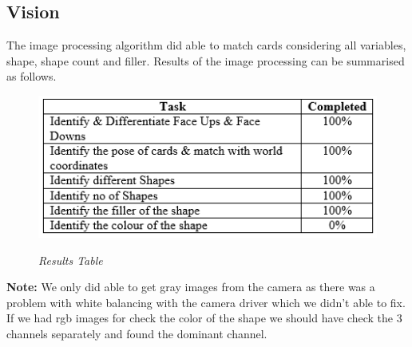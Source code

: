 \subsection{Vision}
The image processing algorithm did able to match cards considering all variables, shape, shape count and filler. Results of the image processing can be summarised as follows.
\begin{figure}[position = here]
	\begin{centering}
		\includegraphics[scale=0.8]{./sachiths_images/image7.png}\\
		\caption[]{\textit{Results Table}}
	\end{centering}
\end{figure}

\textbf{Note:} We only did able to get gray images from the camera as there was a problem with white balancing with the camera driver which we didn't able to fix. If we had rgb images for check the color of the shape we should have check the 3 channels separately and found the dominant channel. 



